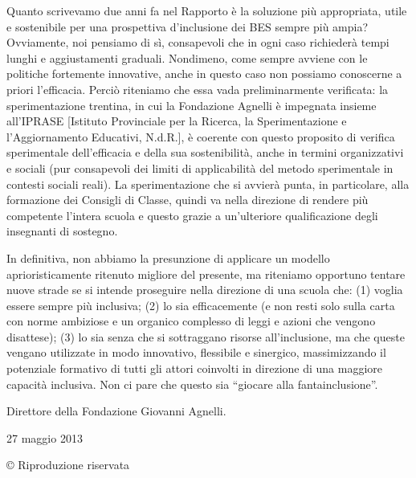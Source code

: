 Quanto scrivevamo due anni fa nel Rapporto è la soluzione più appropriata, utile e sostenibile per una prospettiva d’inclusione dei BES sempre più ampia? Ovviamente, noi pensiamo di sì, consapevoli che in ogni caso richiederà tempi lunghi e aggiustamenti graduali. Nondimeno, come sempre avviene con le politiche fortemente innovative, anche in questo caso non possiamo conoscerne a priori l’efficacia.
Perciò riteniamo che essa vada preliminarmente verificata: la sperimentazione trentina, in cui la Fondazione Agnelli è impegnata insieme all’IPRASE [Istituto Provinciale per la Ricerca, la Sperimentazione e l’Aggiornamento Educativi, N.d.R.], è coerente con questo proposito di verifica sperimentale dell’efficacia e della sua sostenibilità, anche in termini organizzativi e sociali (pur consapevoli dei limiti di applicabilità del metodo sperimentale in contesti sociali reali). La sperimentazione che si avvierà punta, in particolare, alla formazione dei Consigli di Classe, quindi va nella direzione di rendere più competente l’intera scuola e questo grazie a un’ulteriore qualificazione degli insegnanti di sostegno.

In definitiva, non abbiamo la presunzione di applicare un modello aprioristicamente ritenuto migliore del presente, ma riteniamo opportuno tentare nuove strade se si intende proseguire nella direzione di una scuola che: (1) voglia essere sempre più inclusiva; (2) lo sia efficacemente (e non resti solo sulla carta con norme ambiziose e un organico complesso di leggi e azioni che vengono disattese); (3) lo sia senza che si sottraggano risorse all’inclusione, ma che queste vengano utilizzate in modo innovativo, flessibile e sinergico, massimizzando il potenziale formativo di tutti gli attori coinvolti in direzione di una maggiore capacità inclusiva.
Non ci pare che questo sia “giocare alla fantainclusione”.

Direttore della Fondazione Giovanni Agnelli.

27 maggio 2013

© Riproduzione riservata